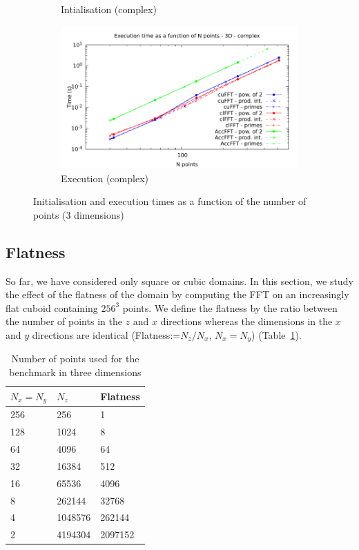 \documentclass[12pt, a4paper]{article}
\begin{document}
\begin{figure}[H]
\begin{subfigure}{.5\textwidth}
\caption{Intialisation (complex)}
\label{FFT3DCI}
\end{subfigure}%
\begin{subfigure}{.5\textwidth}
\centering
\includegraphics[width=.9\linewidth]{graphs/fft-3d-c-exec.pdf}
\caption{Execution (complex)}
\label{FFT3DCE}
\end{subfigure}
\caption{Initialisation and execution times as a function of the number of points (3 dimensions)}
\label{FFT3D}
\end{figure}

\subsection{Flatness}\label{FLATNESS}
So far, we have considered only square or cubic domains. In this
section, we study the effect of the flatness of the domain by
computing the FFT on an increasingly flat cuboid containing $256^3$
points. We define the flatness by the ratio between the number of
points in the $z$ and $x$ directions whereas the dimensions in the $x$
and $y$ directions are identical (Flatness:=$N_z/N_x$, $N_x=N_y$)
(Table~\ref{FLATNESSDIM}).

\begin{table}[H]
\centering
\begin{tabular}{|l|l|l|}
\hline
$N_x=N_y$ & $N_z $ & Flatness\\ 
\hline
\hline
256 & 256 & 1\\ \hline
128 & 1024 & 8\\ \hline
64 & 4096 & 64\\ \hline
32 & 16384 & 512\\ \hline
16 & 65536 & 4096\\ \hline
8 & 262144 & 32768\\ \hline
4 & 1048576 & 262144\\ \hline 
2 & 4194304 & 2097152\\ \hline
\end{tabular}
\caption{Number of points used for the benchmark in three dimensions}\label{FLATNESSDIM}
\end{table}
\end{document}

